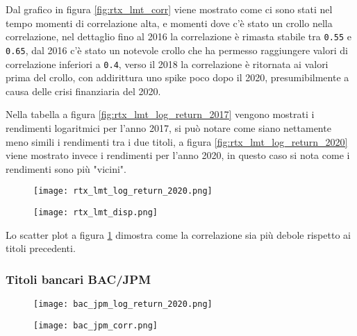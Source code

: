 Dal grafico in figura \ref{fig:rtx_lmt_corr} viene mostrato come ci sono stati nel tempo momenti di correlazione alta, e momenti dove c'è stato un crollo nella correlazione, nel dettaglio
fino al 2016 la correlazione è rimasta stabile tra \verb|0.55| e \verb|0.65|, dal 2016 c'è stato un notevole crollo che ha permesso raggiungere  valori di correlazione inferiori a \verb|0.4|,
verso il 2018 la correlazione è ritornata ai valori prima del crollo, con addirittura uno spike poco dopo il 2020, presumibilmente a causa delle crisi finanziaria del 2020.

Nella tabella a figura \ref{fig:rtx_lmt_log_return_2017} vengono mostrati i rendimenti logaritmici per l'anno 2017, si può notare come siano
nettamente meno simili i rendimenti tra i due titoli, a figura \ref{fig:rtx_lmt_log_return_2020} viene mostrato invece i rendimenti per l'anno 2020, in questo caso si nota come i rendimenti sono più "vicini".

\begin{figure}[h]
  \centering
  \begin{minipage}{.4\textwidth}
    \centering
    \texttt{[image: rtx\_lmt\_log\_return\_2020.png]}
    \label{fig:rtx_lmt_log_return_2020}
  \end{minipage}%
  \begin{minipage}{.6\textwidth}
    \centering
    \texttt{[image: rtx\_lmt\_disp.png]}
    \label{fig:rtx_lmt_disp}
  \end{minipage}
\end{figure}

Lo scatter plot a figura \ref{fig:rtx_lmt_disp} dimostra come la correlazione sia più debole rispetto ai titoli precedenti.

\pagebreak

\subsubsection{Titoli bancari BAC/JPM}

\begin{figure}[h]
  \centering
  \begin{minipage}{.4\textwidth}
    \centering
    \texttt{[image: bac\_jpm\_log\_return\_2020.png]}
    \label{fig:bac_jpm_log_return_2020}
  \end{minipage}%
  \begin{minipage}{.6\textwidth}
    \centering
    \texttt{[image: bac\_jpm\_corr.png]}
    \label{fig:bac_jpm_corr}
  \end{minipage}
\end{figure}

